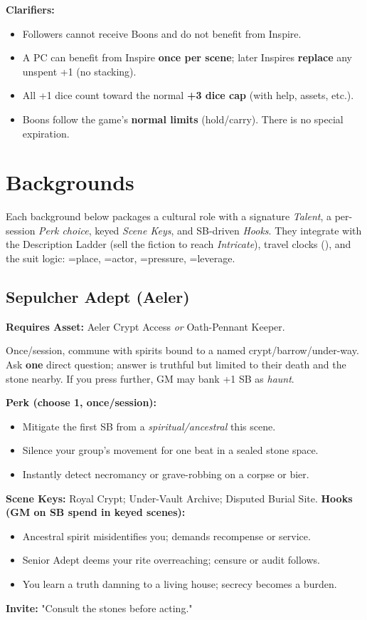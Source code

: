 \textbf{Clarifiers:}
\begin{itemize}
  \item Followers cannot receive Boons and do not benefit from Inspire.
  \item A PC can benefit from Inspire \textbf{once per scene}; later Inspires \textbf{replace} any unspent +1 (no stacking).
  \item All +1 dice count toward the normal \textbf{+3 dice cap} (with help, assets, etc.).
  \item Boons follow the game's \textbf{normal limits} (hold/carry). There is no special expiration.
\end{itemize}

\section{Backgrounds}
Each background below packages a cultural role with a signature \emph{Talent}, a per-session \emph{Perk choice}, keyed \emph{Scene Keys}, and SB-driven \emph{Hooks}. They integrate with the Description Ladder (sell the fiction to reach \emph{Intricate}), travel clocks (\ClockSizes), and the suit logic: \SuitSpade{}=place, \SuitHeart{}=actor, \SuitClub{}=pressure, \SuitDiamond{}=leverage.

\subsection{Sepulcher Adept (Aeler)}
\textbf{Requires Asset:} Aeler Crypt Access \emph{or} Oath-Pennant Keeper.
\begin{tcolorbox}[enhanced,sharp corners,boxrule=.6pt,title={Talent — Whisper of the Unquiet Dead (6 XP)}]
Once/session, commune with spirits bound to a named crypt/barrow/under-way. Ask \textbf{one} direct question; answer is truthful but limited to their death and the stone nearby. If you press further, GM may bank +1 SB as \emph{haunt}.
\end{tcolorbox}
\textbf{Perk (choose 1, once/session):}
\begin{itemize}
  \item Mitigate the first SB from a \emph{spiritual/ancestral} \SuitClub{} this scene.
  \item Silence your group's movement for one beat in a sealed stone space.
  \item Instantly detect necromancy or grave-robbing on a corpse or bier.
\end{itemize}
\textbf{Scene Keys:} Royal Crypt; Under-Vault Archive; Disputed Burial Site.
\textbf{Hooks (GM on SB spend in keyed scenes):}
\begin{itemize}
  \item Ancestral spirit misidentifies you; demands recompense or service.
  \item Senior Adept deems your rite overreaching; censure or audit follows.
  \item You learn a truth damning to a living house; secrecy becomes a burden.
\end{itemize}
\textbf{Invite:} "Consult the stones before acting."


